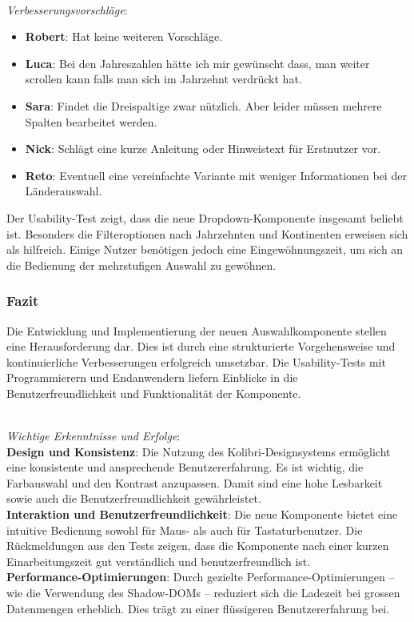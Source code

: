  \\
\emph{Verbesserungsvorschläge}: 

\begin{itemize}
    \item \textbf{Robert}: 
          Hat keine weiteren Vorschläge.
\item \textbf{Luca}:
Bei den Jahreszahlen hätte ich mir gewünscht dass, man weiter scrollen kann falls man sich im Jahrzehnt verdrückt hat.
\item \textbf{Sara}:
          Findet die Dreispaltige zwar nützlich. 
          Aber leider müssen mehrere Spalten bearbeitet werden. 
    \item \textbf{Nick}: 
          Schlägt eine kurze Anleitung oder Hinweistext für Erstnutzer vor. 
    \item \textbf{Reto}: 
          Eventuell eine vereinfachte Variante mit weniger Informationen bei der Länderauswahl. 
\end{itemize}

Der Usability-Test zeigt, dass die neue Dropdown-Komponente insgesamt beliebt ist. 
Besonders die Filteroptionen nach Jahrzehnten und Kontinenten erweisen sich als hilfreich. 
Einige Nutzer benötigen jedoch eine Eingewöhnungszeit, um sich an die Bedienung der mehrstufigen Auswahl zu gewöhnen. 


\subsubsection{\color{dblue} Fazit}
\label{sec:userTestsSummery}

Die Entwicklung und Implementierung der neuen Auswahlkomponente stellen eine Herausforderung dar. 
Dies ist durch eine strukturierte Vorgehensweise und kontinuierliche Verbesserungen erfolgreich umsetzbar. 
Die Usability-Tests mit Programmierern und Endanwendern liefern Einblicke in die Benutzerfreundlichkeit und Funktionalität der Komponente. 

 \\
\noindent
\emph{Wichtige Erkenntnisse und Erfolge}: 
\\
\textbf{Design und Konsistenz}: 
Die Nutzung des Kolibri-Designsystems ermöglicht eine konsistente und ansprechende Benutzererfahrung. 
Es ist wichtig, die Farbauswahl und den Kontrast anzupassen. 
Damit sind eine hohe Lesbarkeit sowie auch die Benutzerfreundlichkeit gewährleistet.
\\
\textbf{Interaktion und Benutzerfreundlichkeit}: 
Die neue Komponente bietet eine intuitive Bedienung sowohl für Maus- als auch für Tastaturbenutzer. 
Die Rückmeldungen aus den Tests zeigen, dass die Komponente nach einer kurzen Einarbeitungszeit gut verständlich und benutzerfreundlich ist. 
\\
\textbf{Performance-Optimierungen}: 
Durch gezielte Performance-Optimierungen – wie die Verwendung des Shadow-DOMs – reduziert sich die Ladezeit bei grossen Datenmengen erheblich. 
Dies trägt zu einer flüssigeren Benutzererfahrung bei. 

